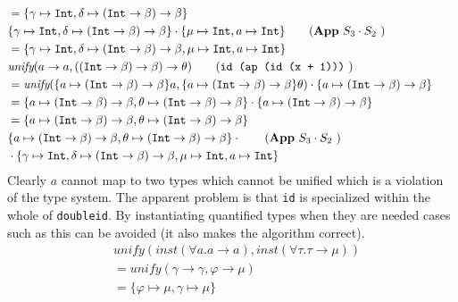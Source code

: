 \documentclass[11pt,oneside,a4paper]{report}
\begin{document}
\begin{exmp}
\begin{align}
    & = \{ \gamma \mapsto \texttt{Int}, \delta \mapsto (\texttt{Int} \rightarrow \beta) \rightarrow \beta \} \tag*{}\\
    &\{ \gamma \mapsto \texttt{Int}, \delta \mapsto (\texttt{Int} \rightarrow \beta) \rightarrow \beta \} \cdot \{ \mu \mapsto \texttt{Int}, a \mapsto \texttt{Int} \} \tag{\textbf{App} $S_3 \cdot S_2$ }\\
    & = \{ \gamma \mapsto \texttt{Int}, \delta \mapsto (\texttt{Int} \rightarrow \beta) \rightarrow \beta, \mu \mapsto \texttt{Int}, a \mapsto \texttt{Int} \} \tag*{}\\
    &\textit{unify}(a \rightarrow a, ((\texttt{Int} \rightarrow \beta) \rightarrow \beta) \rightarrow \theta) \tag{\texttt{id (ap (id (x + 1)))} }\\
    &= \textit{unify}(
     \{ a \mapsto  (\texttt{Int} \rightarrow \beta) \rightarrow \beta \} a,
     \{ a \mapsto  (\texttt{Int} \rightarrow \beta) \rightarrow \beta\} \theta
    ) \cdot \{ a \mapsto  (\texttt{Int} \rightarrow \beta) \rightarrow \beta\} \tag*{}\\
    &= \{ a \mapsto (\texttt{Int} \rightarrow \beta) \rightarrow \beta, \theta \mapsto (\texttt{Int} \rightarrow \beta) \rightarrow \beta \} \cdot \{ a \mapsto (\texttt{Int} \rightarrow \beta) \rightarrow \beta\} \tag*{}\\
    &= \{ a \mapsto (\texttt{Int} \rightarrow \beta) \rightarrow \beta, \theta \mapsto (\texttt{Int} \rightarrow \beta) \rightarrow \beta \} \tag*{}\\
    &\{ a \mapsto (\texttt{Int} \rightarrow \beta) \rightarrow \beta, \theta \mapsto (\texttt{Int} \rightarrow \beta) \rightarrow \beta \} \cdot \tag{\textbf{App} $S_3 \cdot S_2$ }\\
    &\cdot \{ \gamma \mapsto \texttt{Int}, \delta \mapsto (\texttt{Int} \rightarrow \beta) \rightarrow \beta, \mu \mapsto \texttt{Int}, a \mapsto \texttt{Int} \} \tag*{}
\end{align}
    Clearly $a$ cannot map to two types which cannot be unified which is a violation of the type system.
    The apparent problem is that \texttt{id} is specialized within the whole of \texttt{doubleid}.
    By instantiating quantified types when they are needed cases such as this can be avoided (it also makes the algorithm correct).
    \begin{align}
        &\textit{unify}(\textit{inst}(\forall a . a \rightarrow a), \textit{inst}(\forall \tau . \tau \rightarrow \mu))\\
        & = \textit{unify}(\gamma \rightarrow \gamma, \varphi \rightarrow \mu) \tag*{}\\
        & = \{ \varphi \mapsto \mu, \gamma \mapsto \mu \} \tag*{}
    \end{align}
\end{exmp}
\end{document}
